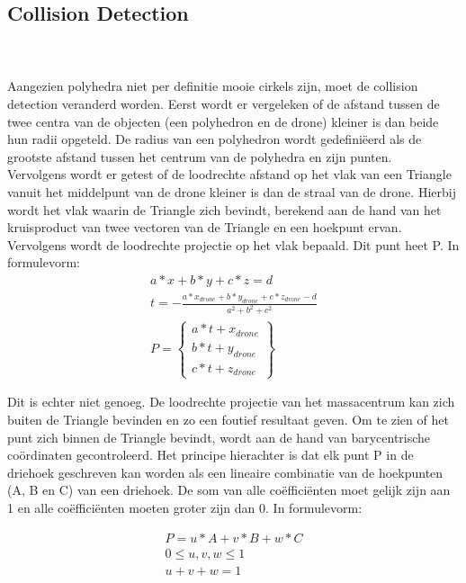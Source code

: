 \subsection{Collision Detection}
\\\\
Aangezien polyhedra niet per definitie mooie cirkels zijn, moet de collision detection veranderd worden. Eerst wordt er vergeleken of de afstand tussen de twee centra van de objecten (een polyhedron en de drone) kleiner is dan beide hun radii opgeteld. De radius van een polyhedron wordt gedefiniëerd als de grootste afstand tussen het centrum van de polyhedra en zijn punten. \\
\noindent
Vervolgens wordt er getest of de loodrechte afstand op het vlak van een Triangle vanuit het middelpunt van de drone kleiner is dan de straal van de drone. Hierbij wordt het vlak waarin de Triangle zich bevindt, berekend aan de hand van het kruisproduct van twee vectoren van de Triangle en een hoekpunt ervan. Vervolgens wordt de loodrechte projectie op het vlak bepaald. Dit punt heet P. In formulevorm: 
\begin{gather*}
	a*x + b*y + c*z = d \\ 
	t = -\frac{a * x_{drone} + b * y_{drone} + c * z_{drone} - d}{a^2 + b^2 + c^2}  \\ P =
	\begin{Bmatrix}
	a*t + x_{drone}\\ 
	b*t + y_{drone}\\ 
	c*t + z_{drone}
	\end{Bmatrix}
\end{gather*}

\noindent
 Dit is echter niet genoeg. De loodrechte projectie van het massacentrum  kan zich buiten de Triangle bevinden en zo een foutief resultaat geven. Om te zien of het punt zich binnen de Triangle bevindt, wordt aan de hand van barycentrische coördinaten gecontroleerd. Het principe hierachter is dat elk punt P in de driehoek geschreven kan worden als een lineaire combinatie van de hoekpunten (A, B en C) van een driehoek. De som van alle coëfficiënten moet gelijk zijn aan 1 en alle coëfficiënten moeten groter zijn dan 0. In formulevorm:
 
 \begin{gather*}
 	P = u*A + v*B + w*C \\
 	0 \le u,v,w \le 1 \\
 	u + v + w = 1
 \end{gather*}

